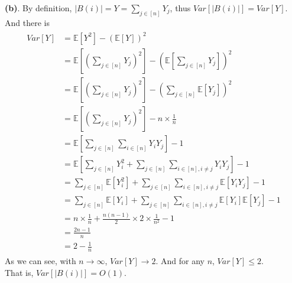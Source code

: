 \documentclass[titlepage, paper=a4, fontsize=11pt]{scrartcl} %
\numberwithin{equation}{section} %
\numberwithin{figure}{section} %
\numberwithin{table}{section} %
\begin{document}
\textbf{(b)}. By definition, $|B(i)| = Y = \sum_{j \in [n]} Y_j$, thus $Var[|B(i)|] = Var[Y]$. And there is \\
\begin{align*} 
\begin{split}
Var[Y] &= \mathbb{E}[Y^2] - (\mathbb{E}[Y])^2 \\
&= \mathbb{E}[(\sum_{j \in [n]} Y_j)^2] - (\mathbb{E}[\sum_{j \in [n]} Y_j])^2 \\
&= \mathbb{E}[(\sum_{j \in [n]} Y_j)^2] - (\sum_{j \in [n]} \mathbb{E}[Y_j])^2 \\
&= \mathbb{E}[(\sum_{j \in [n]} Y_j)^2] - n \times \frac{1}{n} \\
&= \mathbb{E}[\sum_{j \in [n]}\sum_{i \in [n]} Y_iY_j] - 1 \\
&= \mathbb{E}[\sum_{j \in [n]} Y_i^2 + \sum_{j \in [n]}\sum_{i \in [n], i \neq j} Y_iY_j] - 1 \\
&= \sum_{j \in [n]}\mathbb{E}[Y_i^2] + \sum_{j \in [n]}\sum_{i \in [n], i \neq j}\mathbb{E}[Y_iY_j] -1 \\
&= \sum_{j \in [n]}\mathbb{E}[Y_i] + \sum_{j \in [n]}\sum_{i \in [n], i \neq j}\mathbb{E}[Y_i]\mathbb{E}[Y_j] -1 \\
&= n \times \frac{1}{n} + \frac{n(n-1)}{2} \times 2 \times \frac{1}{n^2} -1 \\
&= \frac{2n-1}{n} \\
&= 2 - \frac{1}{n}
\end{split}					
\end{align*}
As we can see, with $n \to \infty$, $Var[Y] \to 2$. And for any $n$, $Var[Y] \leqslant 2$. \\
That is, $Var[|B(i)|] = O(1)$.
\\
\end{document}
